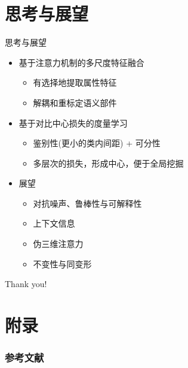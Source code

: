 \documentclass[usenames,dvipsnames,notes]{beamer}
\newcommand{\chuhao}{\fontsize{44.9pt}{\baselineskip}\selectfont}
\begin{document}
\section{思考与展望}

\begin{frame}{思考与展望}
	\begin{itemize}
		\item 基于注意力机制的多尺度特征融合
		\begin{itemize}
			\item 有选择地提取属性特征
			\item 解耦和重标定语义部件
		\end{itemize}
		\item 基于对比中心损失的度量学习
		\begin{itemize}
			\item 鉴别性(更小的类内间距) + 可分性
			\item 多层次的损失，形成中心，便于全局挖掘
		\end{itemize}
	\item 展望
	\begin{itemize}
		\item 对抗噪声、鲁棒性与可解释性
		\item 上下文信息
		\item 伪三维注意力
		\item 不变性与同变形
	\end{itemize}
	\end{itemize}
	 \note{
	 }
\end{frame}

\begin{frame}
	\chuhao Thank you! %
\end{frame}

\section{附录}

\begin{frame}[t, allowframebreaks]
\frametitle{参考文献}
\printbibliography
\end{frame}
\end{document}
